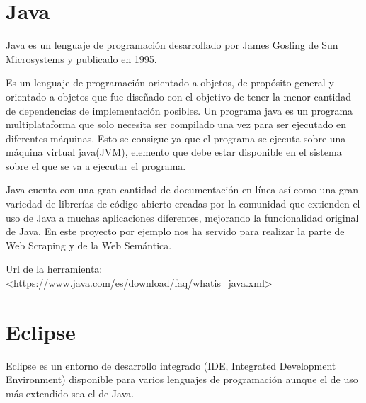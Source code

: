 

\section{Java}

Java es un lenguaje de programación desarrollado por James Gosling de Sun Microsystems y publicado en 1995.

Es un lenguaje de programación orientado a objetos, de propósito general y orientado a objetos que fue diseñado con el objetivo de tener la menor cantidad de dependencias de implementación posibles. Un programa java es un programa multiplataforma que solo necesita ser compilado una vez para ser ejecutado en diferentes máquinas. Esto se consigue ya que el programa se ejecuta sobre una máquina virtual java(JVM), elemento que debe estar disponible en el sistema sobre el que se va a ejecutar el programa.

Java cuenta con una gran cantidad de documentación en línea así como una gran variedad de librerías de código abierto creadas por la comunidad que extienden el uso de Java a muchas aplicaciones diferentes, mejorando la funcionalidad original de Java. En este proyecto por ejemplo nos ha servido para realizar la parte de Web Scraping y de la Web Semántica.

Url de la herramienta: \url{<https://www.java.com/es/download/faq/whatis_java.xml>}

\section{Eclipse}

Eclipse es un entorno de desarrollo integrado (IDE, Integrated Development Environment) disponible para varios lenguajes de programación aunque el de uso más extendido sea el de Java. 

